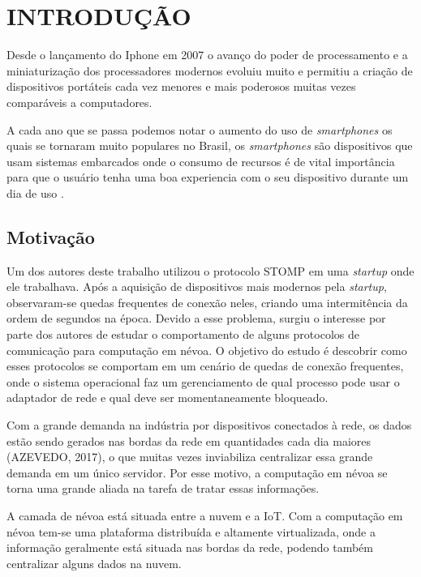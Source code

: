 




\chapter{INTRODUÇÃO}
\label{chap:introducao}

Desde o lançamento do Iphone em 2007 o avanço do poder de processamento e a miniaturização dos processadores modernos evoluiu muito e permitiu a criação de dispositivos portáteis cada vez menores e mais poderosos muitas vezes comparáveis a computadores.\par
A cada ano que se passa podemos notar o aumento do uso de \textit{smartphones} os quais se tornaram muito populares no Brasil, os \textit{smartphones} são dispositivos que usam sistemas embarcados onde o consumo de recursos é de vital importância para que o usuário tenha uma boa experiencia com o seu dispositivo durante um dia de uso \cite{Silva2017, Coutinho2014}.

\section{\textbf{Motivação}}

Um dos autores deste trabalho utilizou o protocolo STOMP em uma \textit{startup} onde ele trabalhava. Após a aquisição de dispositivos mais modernos pela \textit{startup}, observaram-se quedas frequentes de conexão neles, criando uma intermitência da ordem de segundos na época. Devido a esse problema, surgiu o interesse por parte dos autores de estudar o comportamento de alguns protocolos de comunicação para computação em névoa. O objetivo do estudo é descobrir como esses protocolos se comportam em um cenário de quedas de conexão frequentes, onde o sistema operacional faz um gerenciamento de qual processo pode usar o adaptador de rede e qual deve ser momentaneamente bloqueado. 

Com a grande demanda na indústria por dispositivos conectados à rede, os dados estão sendo gerados nas bordas da rede em quantidades cada dia maiores (AZEVEDO, 2017), o que muitas vezes inviabiliza centralizar essa grande demanda em um único servidor. Por esse motivo, a computação em névoa se torna uma grande aliada na tarefa de tratar essas informações. 

A camada de névoa está situada entre a nuvem e a IoT. Com a computação em névoa tem-se uma plataforma distribuída e altamente virtualizada, onde a informação geralmente está situada nas bordas da rede, podendo também centralizar alguns dados na nuvem. 

